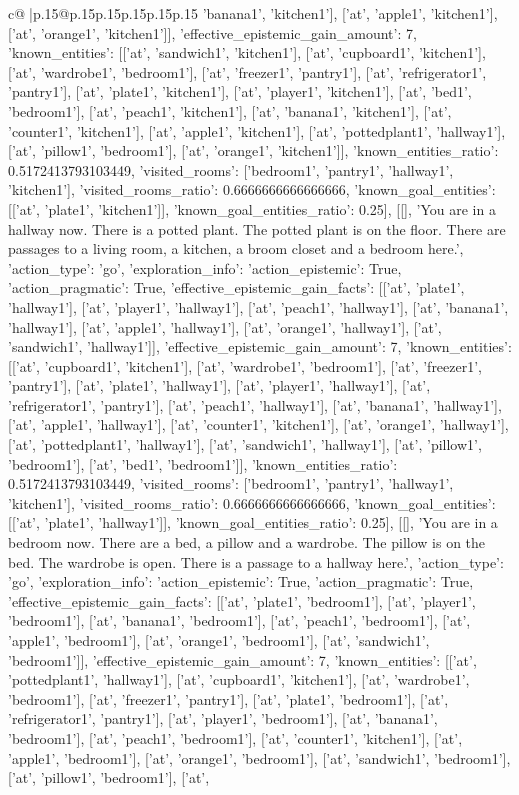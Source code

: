 \documentclass{article}
\begin{document}
{\begin{supertabular}{c@{$\;$}|p{.15\linewidth}@{}p{.15\linewidth}p{.15\linewidth}p{.15\linewidth}p{.15\linewidth}p{.15\linewidth}}
{{{'banana1', 'kitchen1'], ['at', 'apple1', 'kitchen1'], ['at', 'orange1', 'kitchen1']], 'effective_epistemic_gain_amount': 7, 'known_entities': [['at', 'sandwich1', 'kitchen1'], ['at', 'cupboard1', 'kitchen1'], ['at', 'wardrobe1', 'bedroom1'], ['at', 'freezer1', 'pantry1'], ['at', 'refrigerator1', 'pantry1'], ['at', 'plate1', 'kitchen1'], ['at', 'player1', 'kitchen1'], ['at', 'bed1', 'bedroom1'], ['at', 'peach1', 'kitchen1'], ['at', 'banana1', 'kitchen1'], ['at', 'counter1', 'kitchen1'], ['at', 'apple1', 'kitchen1'], ['at', 'pottedplant1', 'hallway1'], ['at', 'pillow1', 'bedroom1'], ['at', 'orange1', 'kitchen1']], 'known_entities_ratio': 0.5172413793103449, 'visited_rooms': ['bedroom1', 'pantry1', 'hallway1', 'kitchen1'], 'visited_rooms_ratio': 0.6666666666666666, 'known_goal_entities': [['at', 'plate1', 'kitchen1']], 'known_goal_entities_ratio': 0.25}}], [[], 'You are in a hallway now. There is a potted plant. The potted plant is on the floor. There are passages to a living room, a kitchen, a broom closet and a bedroom here.\n', {'action_type': 'go', 'exploration_info': {'action_epistemic': True, 'action_pragmatic': True, 'effective_epistemic_gain_facts': [['at', 'plate1', 'hallway1'], ['at', 'player1', 'hallway1'], ['at', 'peach1', 'hallway1'], ['at', 'banana1', 'hallway1'], ['at', 'apple1', 'hallway1'], ['at', 'orange1', 'hallway1'], ['at', 'sandwich1', 'hallway1']], 'effective_epistemic_gain_amount': 7, 'known_entities': [['at', 'cupboard1', 'kitchen1'], ['at', 'wardrobe1', 'bedroom1'], ['at', 'freezer1', 'pantry1'], ['at', 'plate1', 'hallway1'], ['at', 'player1', 'hallway1'], ['at', 'refrigerator1', 'pantry1'], ['at', 'peach1', 'hallway1'], ['at', 'banana1', 'hallway1'], ['at', 'apple1', 'hallway1'], ['at', 'counter1', 'kitchen1'], ['at', 'orange1', 'hallway1'], ['at', 'pottedplant1', 'hallway1'], ['at', 'sandwich1', 'hallway1'], ['at', 'pillow1', 'bedroom1'], ['at', 'bed1', 'bedroom1']], 'known_entities_ratio': 0.5172413793103449, 'visited_rooms': ['bedroom1', 'pantry1', 'hallway1', 'kitchen1'], 'visited_rooms_ratio': 0.6666666666666666, 'known_goal_entities': [['at', 'plate1', 'hallway1']], 'known_goal_entities_ratio': 0.25}}], [[], 'You are in a bedroom now. There are a bed, a pillow and a wardrobe. The pillow is on the bed. The wardrobe is open. There is a passage to a hallway here.\n', {'action_type': 'go', 'exploration_info': {'action_epistemic': True, 'action_pragmatic': True, 'effective_epistemic_gain_facts': [['at', 'plate1', 'bedroom1'], ['at', 'player1', 'bedroom1'], ['at', 'banana1', 'bedroom1'], ['at', 'peach1', 'bedroom1'], ['at', 'apple1', 'bedroom1'], ['at', 'orange1', 'bedroom1'], ['at', 'sandwich1', 'bedroom1']], 'effective_epistemic_gain_amount': 7, 'known_entities': [['at', 'pottedplant1', 'hallway1'], ['at', 'cupboard1', 'kitchen1'], ['at', 'wardrobe1', 'bedroom1'], ['at', 'freezer1', 'pantry1'], ['at', 'plate1', 'bedroom1'], ['at', 'refrigerator1', 'pantry1'], ['at', 'player1', 'bedroom1'], ['at', 'banana1', 'bedroom1'], ['at', 'peach1', 'bedroom1'], ['at', 'counter1', 'kitchen1'], ['at', 'apple1', 'bedroom1'], ['at', 'orange1', 'bedroom1'], ['at', 'sandwich1', 'bedroom1'], ['at', 'pillow1', 'bedroom1'], ['at', }}}
\end{supertabular}}
\end{document}
